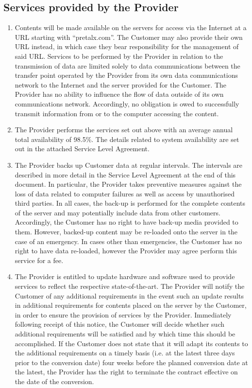 \documentclass{terms}
\begin{document}
\subsection{Services provided by the Provider}
\begin{enumerate}
\item Contents will be made available on the servers for access via the Internet at a URL starting with “pretalx.com”.
      The Customer may also provide their own URL instead, in which case they bear responsibility for the management of said URL.
      Services to be performed by the Provider in relation to the transmission of data are limited solely to data communications between the transfer point operated by the Provider from its own data communications network to the Internet and the server provided for the Customer.
      The Provider has no ability to influence the flow of data outside of its own communications network.
      Accordingly, no obligation is owed to successfully transmit information from or to the computer accessing the content.
\item The Provider performs the services set out above with an average annual total availability of 98.5\%.
      The details related to system availability are set out in the attached Service Level Agreement.
\item The Provider backs up Customer data at regular intervals.
      The intervals are described in more detail in the Service Level Agreement at the end of this document.
      In particular, the Provider takes preventive measures against the loss of data related to computer failures as well as access by unauthorised third parties.
      In all cases, the back-up is performed for the complete contents of the server and may potentially include data from other customers.
      Accordingly, the Customer has no right to have back-up media provided to them.
      However, backed-up content may be re-loaded onto the server in the case of an emergency.
      In cases other than emergencies, the Customer has no right to have data re-loaded, however the Provider may agree perform this service for a fee.
\item The Provider is entitled to update hardware and software used to provide services to reflect the respective state-of-the-art.
      The Provider will notify the Customer of any additional requirements in the event such an update results in additional requirements for contents placed on the server by the Customer, in order to ensure the provision of services by the Provider.
      Immediately following receipt of this notice, the Customer will decide whether such additional requirements will be satisfied and by which time this should be accomplished.
      If the Customer does not state that it will adapt its contents to the additional requirements on a timely basis (i.e. at the latest three days prior to the conversion date) four weeks before the planned conversion date at the latest, the Provider has the right to terminate the contract effective on the date of the conversion.

\end{enumerate}
\end{document}

